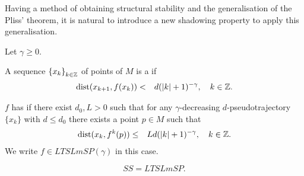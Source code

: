 Having a method of obtaining structural stability and the generalisation of the Pliss' theorem, it is natural to introduce a new shadowing property to apply this generalisation.

Let $\gamma\geq 0.$

\begin{deffnon}
A sequence $\left\{ {x}_{k} \right\}_{k\in\mathbb Z}$ of points of $M$ is a  if
\begin{eqnarray*}
\operatorname{dist}(x_{k+1},f(x_k))& < &d(|k|+1)^{-\gamma},\quad k\in\mathbb Z.
\end{eqnarray*}
\end{deffnon}

\begin{deffnon}
$f$ has  if there exist $d_0,L>0$ such that for any $\gamma$-decreasing $d$-pseudotrajectory $\{x_k\}$ with $d\leq d_0$ there exists a point $p\in M$ such that
\begin{eqnarray*}
\operatorname{dist}(x_{k},f^k(p)) &\leq & Ld(|k|+1)^{-\gamma},\quad k\in\mathbb Z.
\end{eqnarray*}
We write $f\in LTSLmSP(\gamma)$ in this case.
\end{deffnon}

\begin{theoremnon}[Todorov, 2012]
\alert{$$ SS = LTSLmSP.$$}
\end{theoremnon}
